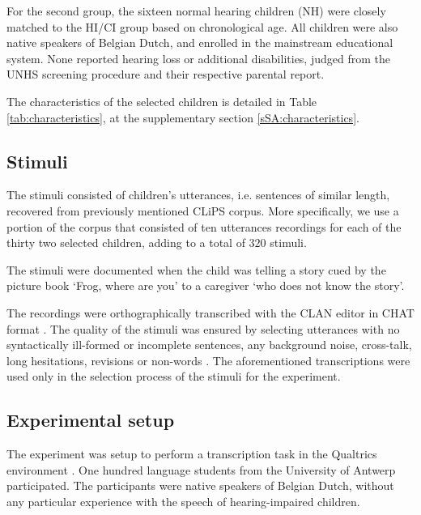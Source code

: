 For the second group, the sixteen normal hearing children (NH) were closely matched to the HI/CI group based on chronological age. All children were also native speakers of Belgian Dutch, and enrolled in the mainstream educational system. None reported hearing loss or additional disabilities, judged from the UNHS screening procedure and their respective parental report.

The characteristics of the selected children is detailed in Table \ref{tab:characteristics}, at the supplementary section \ref{sSA:characteristics}. 
%
%
\subsection{Stimuli} \label{sS:stimuli}
%
The stimuli consisted of children's utterances, i.e. sentences of similar length, recovered from previously mentioned CLiPS corpus. More specifically, we use a portion of the corpus that consisted of ten utterances recordings for each of the thirty two selected children, adding to a total of $320$ stimuli. 

The stimuli were documented when the child was telling a story cued by the picture book `Frog, where are you' \citep{Mayer_1969} to a caregiver `who does not know the story'. 

The recordings were orthographically transcribed with the CLAN editor in CHAT format \cite{MacWhinney_2020}. The quality of the stimuli was ensured by selecting utterances with no syntactically ill-formed or incomplete sentences, any background noise, cross-talk, long hesitations, revisions or non-words \citep{Boonen_et_al_2021}. The aforementioned transcriptions were used only in the selection process of the stimuli for the experiment. 
%
\begin{comment}
	under the Design of Experiments (DoE) literature, we would say we have $32$ experimental units with $10$ replicate runs each, making a total of $320$ experimental runs. As it is defined in \citet{Lawson_2015}, an experimental unit is the item under study upon which something is changed, while a replicate run is the experiment conducted with the same factor settings, but using different experimental units. 
\end{comment}
%
%
\subsection{Experimental setup} \label{sS:setup}
%
The experiment was setup to perform a transcription task in the Qualtrics environment \cite{Qualtrics_2005}. One hundred language students from the University of Antwerp participated. The participants were native speakers of Belgian Dutch, without any particular experience with the speech of hearing-impaired children.

